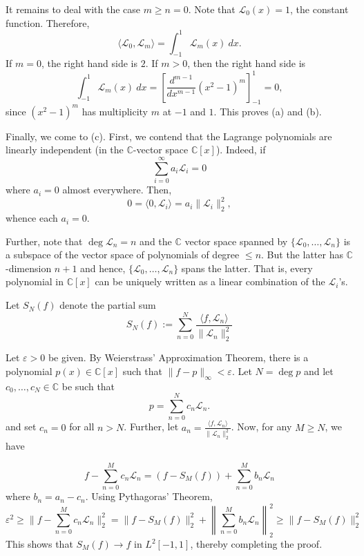 \documentclass[12pt]{amsart}
\newcommand{\bbC}{\mathbb{C}}
\newcommand{\calL}{\mathcal{L}}
\begin{document}
It remains to deal with the case $m\ge n = 0$. Note that $\calL_0(x) = 1$, the constant function. Therefore, 
\begin{equation*}
	\langle\calL_0,\calL_m\rangle = \int_{-1}^1\calL_m(x)~dx.
\end{equation*}
If $m = 0$, the right hand side is $2$. If $m > 0$, then the right hand side is 
\begin{equation*}
	\int_{-1}^1\calL_m(x)~dx = \left[\frac{d^{m - 1}}{dx^{m - 1}}(x^2 - 1)^m\right]_{-1}^1 = 0,
\end{equation*}
since $(x^2 - 1)^m$ has multiplicity $m$ at $-1$ and $1$. This proves (a) and (b).

Finally, we come to (c). First, we contend that the Lagrange polynomials are linearly independent (in the $\bbC$-vector space $\bbC[x]$). Indeed, if 
\begin{equation*}
	\sum_{i = 0}^\infty a_i\calL_i = 0
\end{equation*}
where $a_i = 0$ almost everywhere. Then, 
\begin{equation*}
	0 = \langle 0, \calL_i\rangle = a_i\|\calL_i\|_2^2,
\end{equation*}
whence each $a_i = 0$.

Further, note that $\deg\calL_n = n$ and the $\bbC$ vector space spanned by $\{\calL_0,\dots,\calL_n\}$ is a subspace of the vector space of polynomials of degree $\le n$. But the latter has $\bbC$-dimension $n + 1$ and hence, $\{\calL_0,\dots,\calL_n\}$ spans the latter. That is, every polynomial in $\bbC[x]$ can be uniquely written as a linear combination of the $\calL_i$'s.

Let $S_N(f)$ denote the partial sum 
\begin{equation*}
	S_N(f) := \sum_{n = 0}^N \frac{\langle f,\calL_n\rangle}{\|\calL_n\|_2^2}
\end{equation*}

Let $\varepsilon > 0$ be given. By Weierstrass' Approximation Theorem, there is a polynomial $p(x)\in\bbC[x]$ such that $\|f - p\|_\infty < \varepsilon$. Let $N = \deg p$ and let $c_0,\dots,c_N\in\bbC$ be such that 
\begin{equation*}
	p = \sum_{n = 0}^N c_n\calL_n.
\end{equation*}
and set $c_n = 0$ for all $n > N$. Further, let $a_n = \frac{\langle f,\calL_n\rangle}{\|\calL_n\|_2^2}$. Now, for any $M\ge N$, we have 

\begin{equation*}
	f - \sum_{n = 0}^M c_n\calL_n = (f - S_M(f)) + \sum_{n = 0}^M b_n\calL_n
\end{equation*}
where $b_n = a_n - c_n$. Using Pythagoras' Theorem, 
\begin{equation*}
	\varepsilon^2\ge\|f - \sum_{n = 0}^M c_n\calL_n\|_2^2 = \|f - S_M(f)\|_2^2 + \left\|\sum_{n = 0}^M b_n\calL_n\right\|_2^2\ge\|f - S_M(f)\|_2^2
\end{equation*}
This shows that $S_M(f)\to f$ in $L^2[-1, 1]$, thereby completing the proof. 
\end{document}
